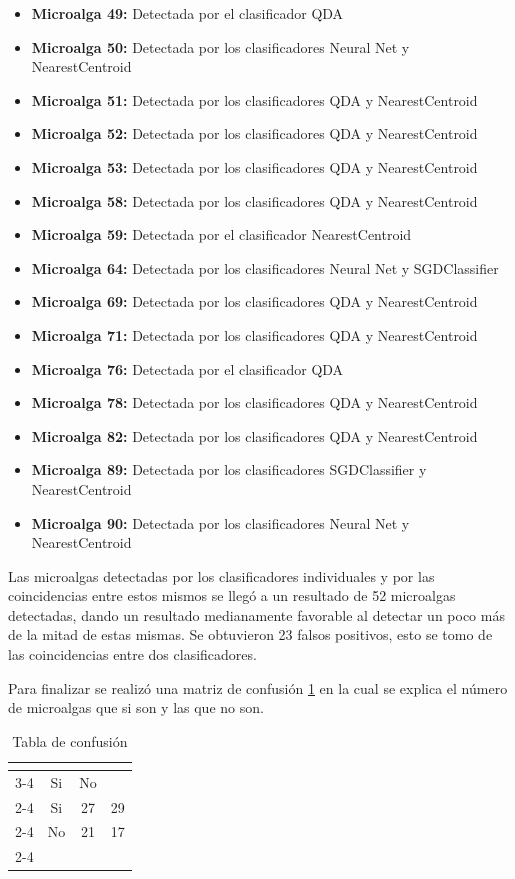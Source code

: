 \documentclass[conference]{IEEEtran}
\begin{document}
\begin{itemize}
    \item \textbf{Microalga 49:} Detectada por el clasificador QDA
    \item \textbf{Microalga 50:} Detectada por los clasificadores Neural Net y NearestCentroid 
    \item \textbf{Microalga 51:} Detectada por los clasificadores QDA y NearestCentroid 
    \item \textbf{Microalga 52:} Detectada por los clasificadores QDA y NearestCentroid
    \item \textbf{Microalga 53:} Detectada por los clasificadores QDA y NearestCentroid
    \item \textbf{Microalga 58:} Detectada por los clasificadores QDA y NearestCentroid
    \item \textbf{Microalga 59:} Detectada por el clasificador NearestCentroid
    \item \textbf{Microalga 64:} Detectada por los clasificadores Neural Net y SGDClassifier
    \item \textbf{Microalga 69:} Detectada por los clasificadores QDA y NearestCentroid
    \item \textbf{Microalga 71:} Detectada por los clasificadores QDA y NearestCentroid
    \item \textbf{Microalga 76:} Detectada por el clasificador QDA
    \item \textbf{Microalga 78:} Detectada por los clasificadores QDA y NearestCentroid
    \item \textbf{Microalga 82:} Detectada por los clasificadores QDA y NearestCentroid
    \item \textbf{Microalga 89:} Detectada por los clasificadores SGDClassifier y NearestCentroid
    \item \textbf{Microalga 90:} Detectada por los clasificadores Neural Net y NearestCentroid 
\end{itemize}

Las microalgas detectadas por los clasificadores individuales y por las coincidencias entre estos mismos se llegó a un resultado de 52 microalgas detectadas, dando un resultado medianamente favorable al detectar un poco más de la mitad de estas mismas. Se obtuvieron 23 falsos positivos, esto se tomo de las coincidencias entre dos clasificadores.

Para finalizar se realizó una matriz de confusión \ref{Tablaconfu} en la cual se explica el número de microalgas que si son y las que no son.


\begin{table}[t]
    \centering
    \begin{tabular}{ c | c | c | c | }
        \multicolumn{2}{c}{} & \multicolumn{2}{c}{} \\ \cline{3-4}
        \multicolumn{2}{c|}{} & Si & No  \\ \cline{2-4}
        \multirow{2}{*} & Si & 27 & 29\\ \cline{2-4}
        & No & 21 & 17 \\ \cline{2-4}
    \end{tabular}
    \caption{Tabla de confusión}
    \label{Tablaconfu}
\end{table}
\end{document}
